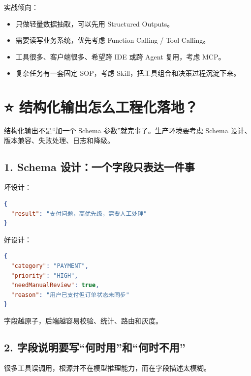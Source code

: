 \documentclass[9pt,a4paper,twocolumn]{ctexart}
\begin{document}
实战倾向：


\begin{itemize}[itemsep=1pt, topsep=2pt]
  \item 只做轻量数据抽取，可以先用 Structured Outputs。
  \item 需要读写业务系统，优先考虑 Function Calling / Tool Calling。
  \item 工具很多、客户端很多、希望跨 IDE 或跨 Agent 复用，考虑 MCP。
  \item 复杂任务有一套固定 SOP，考虑 Skill，把工具组合和决策过程沉淀下来。
\end{itemize}


\section*{⭐️ 结构化输出怎么工程化落地？}


结构化输出不是“加一个 Schema 参数”就完事了。生产环境要考虑 Schema 设计、版本兼容、失败处理、日志和降级。



\subsection*{1. Schema 设计：一个字段只表达一件事}


坏设计：



\begin{lstlisting}[language=json]
{
  "result": "支付问题，高优先级，需要人工处理"
}
\end{lstlisting}



好设计：



\begin{lstlisting}[language=json]
{
  "category": "PAYMENT",
  "priority": "HIGH",
  "needManualReview": true,
  "reason": "用户已支付但订单状态未同步"
}
\end{lstlisting}



字段越原子，后端越容易校验、统计、路由和灰度。



\subsection*{2. 字段说明要写“何时用”和“何时不用”}


很多工具误调用，根源并不在模型推理能力，而在字段描述太模糊。
\end{document}
